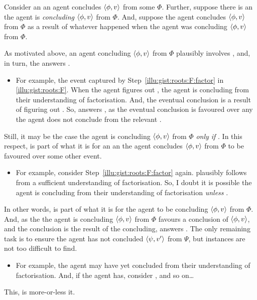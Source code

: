 \begin{note}
  Consider an  an agent concludes \(\langle\phi, v\rangle\) from some \pool{} \(\Phi\).
  Further, suppose there is an  the agent is \emph{concluding} \(\langle\phi, v\rangle\) from \(\Phi\).
  And, suppose the agent concludes \(\langle\phi, v\rangle\) from \(\Phi\) as a result of whatever happened when the agent was concluding \(\langle\phi, v\rangle\) from \(\Phi\).

  As motivated above, an agent concluding \(\langle\phi, v\rangle\) from \(\Phi\) plausibly involves , and, in turn, the \fingfr{} answers \qWhy{}.
  \begin{itemize}
  \item
    For example, the event captured by Step~\ref{illu:gist:roots:F:factor} in \autoref{illu:gist:roots:F}.
    When the agent figures out \rootsConEqFac{}, the agent is concluding  from their understanding of factorisation.
    And, the eventual conclusion is a result of figuring out \rootsConEqFac{}.
    So,  answers \qWhy{}, as the \agents{} eventual conclusion is favoured over any  the agent does not conclude  from the relevant \pool{}.
  \end{itemize}
  Still, it may be the case the agent is concluding \(\langle\phi, v\rangle\) from \(\Phi\) \emph{only if} .
  In this respect,  is part of what it is for an an  the agent concludes \(\langle\phi, v\rangle\) from \(\Phi\) to be favoured over some other event.
  \begin{itemize}
  \item
    For example, consider Step~\ref{illu:gist:roots:F:factor} again.
     plausibly follows from a sufficient understanding of factorisation.
    So, I doubt it is possible the agent is concluding  from their understanding of factorisation \emph{unless} .
  \end{itemize}
  In other words,  is part of what it is for the agent to be concluding \(\langle\phi, v\rangle\) from \(\Phi\).
  And, as the  the agent is concluding \(\langle\phi, v\rangle\) from \(\Phi\) favours a conclusion of \(\langle\phi, v\rangle\), and the conclusion is the result of the concluding,  answers \qWhy{}.
  The only remaining task is to ensure the agent has not concluded \(\langle\psi, v'\rangle\) from \(\Psi\), but instances are not too difficult to find.
  \begin{itemize}
  \item
    For example, the agent may have yet concluded  from their understanding of factorisation.
    And, if the agent has, consider , and so on\dots
  \end{itemize}
  This, is more-or-less it.


\end{note}
